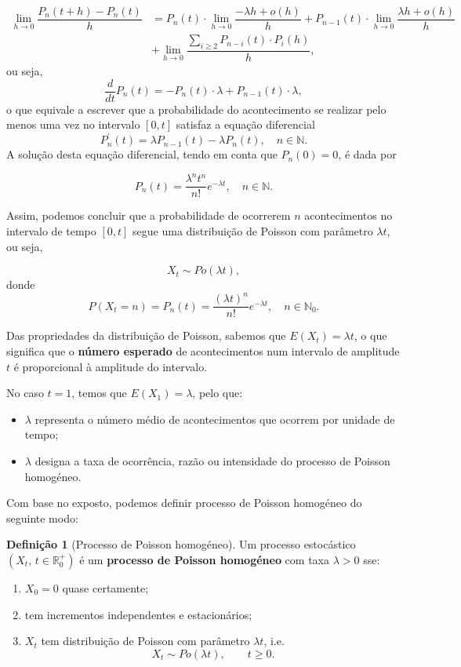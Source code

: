 \documentclass[
  11pt,
  a4paper,
]{book}
\theoremstyle{definition}
\newtheorem{definition}{Definição}[chapter]
\theoremstyle{definition}
\theoremstyle{definition}
\theoremstyle{definition}
\theoremstyle{remark}
\begin{document}
\begin{align*}
\lim\limits_{h \to 0}\dfrac{P_n(t+h)-P_n(t)}{h} &= P_n(t) \cdot \lim\limits_{h \to 0} \dfrac{- \lambda h + o(h)}{h} + P_{n-1}(t) \cdot \lim\limits_{h \to 0} \dfrac{\lambda h + o(h)}{h} \\
& +\lim\limits_{h \to 0} \dfrac{\sum\limits_{i \geq 2}P_{n-i}(t) \cdot P_{i}(h)}{h},
\end{align*}
ou seja,
\[\dfrac{d}{dt}P_n(t)=-P_n(t) \cdot \lambda +  P_{n-1}(t) \cdot \lambda,\]
o que equivale a escrever que a probabilidade do acontecimento se realizar pelo menos uma vez no intervalo \([0,t]\) satisfaz a equação diferencial
\[\boxed{P^{'}_n(t)=\lambda P_{n-1}(t) - \lambda P_n(t), \quad n \in \mathbb{N}.}\]
A solução desta equação diferencial, tendo em conta que \(P_n(0)=0\), é dada por

\[\boxed{P_n(t)=\dfrac{\lambda^n t^n}{n!} e^{-\lambda t}, \quad n \in \mathbb{N}.}\]

Assim, podemos concluir que a probabilidade de ocorrerem \(n\) acontecimentos no intervalo de tempo \([0,t]\) segue uma distribuição de Poisson com parâmetro \(\lambda t\), ou seja,

\[X_t \sim Po(\lambda t),\]
donde
\[
P(X_t=n)=P_n(t)=\dfrac{(\lambda t)^n}{n!} e^{-\lambda t}, \quad n \in \mathbb{N}_0.
\]

Das propriedades da distribuição de Poisson, sabemos que \(E(X_t)=\lambda t\), o que significa que o \textbf{número esperado} de acontecimentos num intervalo de amplitude \(t\) é proporcional à amplitude do intervalo.

No caso \(t=1\), temos que \(E(X_1)=\lambda\), pelo que:

\begin{itemize}
\item
  \(\lambda\) representa o número médio de acontecimentos que ocorrem por unidade de tempo;
\item
  \(\lambda\) designa a taxa de ocorrência, razão ou intensidade do processo de Poisson homogéneo.
\end{itemize}

Com base no exposto, podemos definir processo de Poisson homogéneo do seguinte modo:

\begin{definition}[Processo de Poisson homogéneo]

Um processo estocástico \((X_t,\,t\in\mathbb{R}_0^+)\) é um \textbf{processo de Poisson homogéneo} com taxa \(\lambda>0\) sse:

\begin{enumerate}
\def\labelenumi{(\roman{enumi})}
\item
  \(X_0=0\) quase certamente;
\item
  tem incrementos independentes e estacionários;
\item
  \(X_t\) tem distribuição de Poisson com parâmetro \(\lambda t\), i.e.
  \[
  X_t \sim Po(\lambda t),\qquad t\ge0.
  \]
\end{enumerate}

\end{definition}
\end{document}
